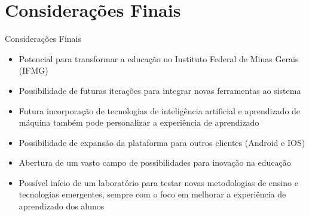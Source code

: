 \AtBeginSection[]{
	\begin{frame}
		\frametitle{}
		\tableofcontents[currentsection]
	\end{frame}
}

\section{Considerações Finais}
\begin{frame}{Considerações Finais}
	\begin{itemize}[<+->]
		\item Potencial para transformar a educação no Instituto Federal de Minas Gerais (IFMG)
		\item Possibilidade de futuras iterações para integrar novas ferramentas ao sistema
		\item Futura incorporação de tecnologias de inteligência artificial e aprendizado de máquina 
		também pode personalizar a experiência de aprendizado
		\item Possibilidade de expansão da plataforma para outros clientes (Android e IOS)
		\item Abertura de um vasto campo de possibilidades para inovação na educação
		\item Possível início de um laboratório para testar novas metodologias de ensino e tecnologias 
		emergentes, sempre com o foco em melhorar a experiência de aprendizado dos alunos
	\end{itemize}
\end{frame}